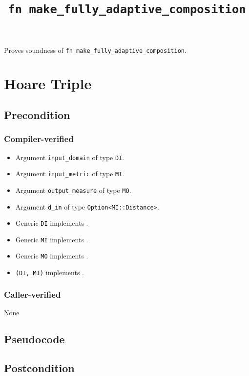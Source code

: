 \documentclass{article}
\title{\texttt{fn make\_fully\_adaptive\_composition}}
\author{\MichaelShoemateAuthor}
\date{}
\begin{document}
\maketitle

\contrib
Proves soundness of \texttt{fn make\_fully\_adaptive\_composition}.

\section{Hoare Triple}
\subsection*{Precondition}
\subsubsection*{Compiler-verified}
\begin{itemize}
    \item Argument \texttt{input\_domain} of type \texttt{DI}.
    \item Argument \texttt{input\_metric} of type \texttt{MI}.
    \item Argument \texttt{output\_measure} of type \texttt{MO}.
    \item Argument \texttt{d\_in} of type \texttt{Option<MI::Distance>}.
    \item Generic \texttt{DI} implements .
    \item Generic \texttt{MI} implements .
    \item Generic \texttt{MO} implements .
    \item \texttt{(DI, MI)} implements .
\end{itemize}

\subsubsection*{Caller-verified}
None

\subsection*{Pseudocode}


\subsection*{Postcondition}
\begin{theorem}
\end{theorem}
\end{document}
